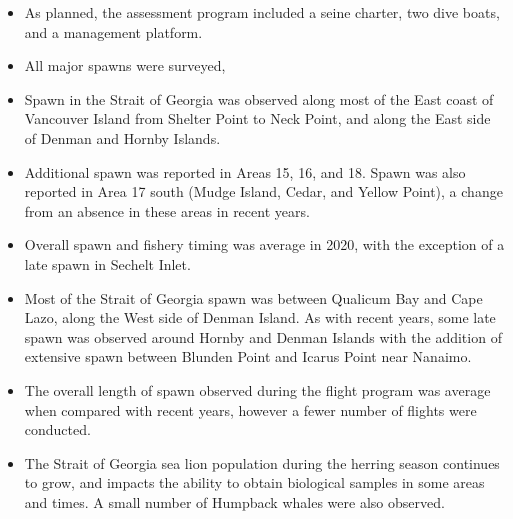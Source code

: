 \begin{itemize}

\item As planned, the assessment program included a seine charter, two dive boats, and a management platform.

\item All major spawns were surveyed, 

\item Spawn in the Strait of Georgia was observed along most of the East coast of Vancouver Island from Shelter Point to Neck Point, and along the East side of Denman and Hornby Islands.

\item Additional spawn was reported in Areas 15, 16, and 18.
Spawn was also reported in Area 17 south (Mudge Island, Cedar, and Yellow Point), a change from an absence in these areas in recent years.

\item Overall spawn and fishery timing was average in 2020, with the exception of a late spawn in Sechelt Inlet.

\item Most of the Strait of Georgia spawn was between Qualicum Bay and Cape Lazo, along the West side of Denman Island.
As with recent years, some late spawn was observed around Hornby and Denman Islands with the addition of extensive spawn between Blunden Point and Icarus Point near Nanaimo.

\item The overall length of spawn observed during the flight program was average when compared with recent years, however a fewer number of flights were conducted.

\item The Strait of Georgia sea lion population during the herring season continues to grow, and impacts the ability to obtain biological samples in some areas and times.
A small number of Humpback whales were also observed.

\end{itemize}
